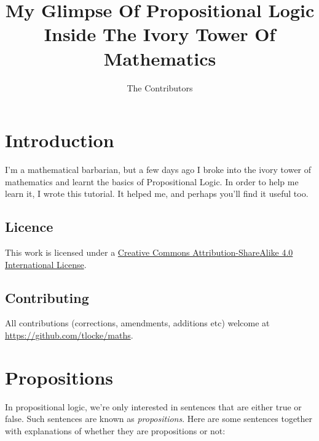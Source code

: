 \documentclass{article}
\author{The Contributors}
\title{My Glimpse Of Propositional Logic Inside The Ivory Tower Of
  Mathematics}
\begin{document}
  \maketitle
  \tableofcontents

  \section{Introduction}

  I'm a mathematical barbarian, but a few days ago I broke into the ivory tower
  of mathematics and learnt the basics of Propositional Logic. In order to help
  me learn it, I wrote this tutorial. It helped me, and perhaps you'll find it
  useful too.

  \subsection{Licence}

    This work is licensed under a
    \href{http://creativecommons.org/licenses/by-sa/4.0/}{Creative Commons
    Attribution-ShareAlike 4.0 International License}.

  \subsection{Contributing}

    All contributions (corrections, amendments, additions etc) welcome at
    \url{https://github.com/tlocke/maths}.


  \section{\label{sec:propositions}Propositions}

    In propositional logic, we're only interested in sentences that are either
    true or false. Such sentences are known as \emph{propositions}. Here are
    some sentences together with explanations of whether they are propositions
    or not:
\end{document}
